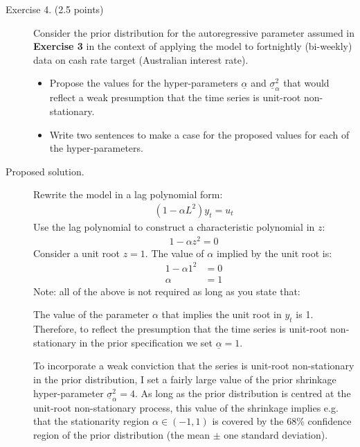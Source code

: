 \documentclass[12pt]{article}
\begin{document}
\begin{adjustwidth}{1cm}{1cm}
\newpage
\begin{description}
\item[Exercise 4. (2.5 points)] Consider the prior distribution for the autoregressive parameter assumed in \textbf{Exercise 3} in the context of applying the model to fortnightly (bi-weekly) data on cash rate target (Australian interest rate).
\begin{itemize}
\item Propose the values for the hyper-parameters $\underline{\alpha}$ and $\underline{\sigma}^2_\alpha$ that would reflect a weak presumption that the time series is unit-root non-stationary. 
\item Write two sentences to make a case for the proposed values for each of the hyper-parameters. 
\end{itemize}

\bigskip\item[Proposed solution.] 
Rewrite the model in a lag polynomial form:
\begin{align}
(1 - \alpha L^2)y_t = u_t
\end{align}
Use the lag polynomial to construct a characteristic polynomial in $z$:
\begin{align}
1 - \alpha z^2 = 0
\end{align}
Consider a unit root $z=1$. The value of $\alpha$ implied by the unit root is:
\begin{align}
1 - \alpha 1^2 &= 0\\
\alpha &= 1
\end{align}
Note: all of the above is not required as long as you state that:

\smallskip\noindent The value of the parameter $\alpha$ that implies the unit root in $y_t$ is 1. Therefore, to reflect the presumption that the time series is unit-root non-stationary in the prior specification we set $\underline{\alpha} = 1$.

\smallskip\noindent To incorporate a weak conviction that the series is unit-root non-stationary in the prior distribution, I set a fairly large value of the prior shrinkage hyper-parameter $\underline{\sigma}^2_\alpha = 4$. As long as the prior distribution is centred at the unit-root non-stationary process, this value of the shrinkage implies e.g. that the stationarity region $\alpha\in(-1, 1)$ is covered by the 68\% confidence region of the prior distribution (the mean $\pm$ one standard deviation). 

%
\end{description} 




\end{adjustwidth}
\end{document}
